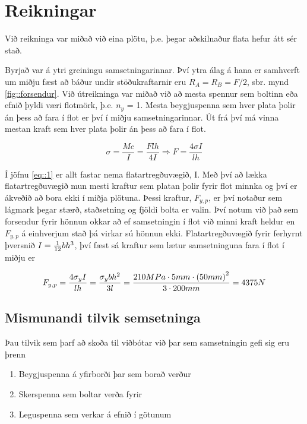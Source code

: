 \section{Reikningar}\label{ch::reikningar}

Við reikninga var miðað við eina plötu, þ.e. þegar aðskilnaður flata hefur átt sér stað. 

Byrjað var á ytri greiningu samsetningarinnar. Því ytra álag á hana er samhverft um miðju fæst að báður undir stöðukraftarnir eru $R_{A} = R_{B} = F/2$, sbr. mynd \ref{fig::forsendur}. Við útreikninga var miðað við að mesta spennur sem boltinn eða efnið þyldi væri flotmörk, þ.e. $n_y$ = 1. Mesta beygjuspenna sem hver plata þolir án þess að fara í flot er því í miðju samsetningarinnar. Út frá því má vinna mestan kraft sem hver plata þolir án þess að fara í flot.

\begin{equation}
	\sigma = \frac{M c}{I} = \frac{F l h}{4I} \Rightarrow F = \frac{4 \sigma I}{l h}
	\label{eq::1}
\end{equation}

Í jöfnu \ref{eq::1} er allt fastar nema flatartregðuvægið, I. Með því að lækka flatartregðuvægið mun mesti kraftur sem platan þolir fyrir flot minnka og því er ákveðið að bora ekki í miðja plötuna. Þessi kraftur, $F_{y,p}$, er því notaður sem lágmark þegar stærð, staðsetning og fjöldi bolta er valin. Því notum við það sem forsendur fyrir hönnun okkar að ef samsetningin í flot við minni kraft heldur en $F_{y,p}$ á einhverjum stað þá virkar sú hönnun ekki. Flatartregðuvægið fyrir ferhyrnt þversnið $I = {1 \over 12}bh^3$, því fæst sá kraftur sem lætur samsetninguna fara í flot í miðju er

\[
	F_{y,p} = \frac{4  \sigma_y I}{l h} = {\sigma_y b h^2 \over 3 l} = {210 MPa \cdot 5 mm \cdot \left(50mm\right)^2 \over 3 \cdot 200mm} = 4375N
\]

\subsection{Mismunandi tilvik semsetninga}

Þau tilvik sem þarf að skoða til viðbótar við þar sem samsetningin gefi sig eru þrenn

\begin{enumerate}
	\item Beygjuspenna á yfirborði þar sem borað verður
	\item Skerspenna sem boltar verða fyrir
	\item Leguspenna sem verkar á efnið í götunum
\end{enumerate}

